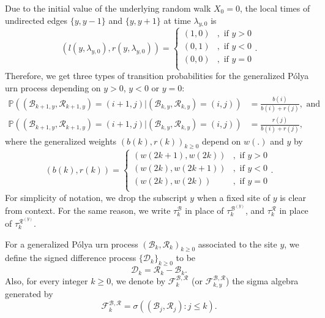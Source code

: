 \documentclass[twoside,12pt,a4paper]{article}
\numberwithin{equation}{section}
\begin{document}
	   Due to the initial value of the underlying random walk $X_0=0$, the local times of undirected edges $\{y,y-1\}$ and $\{y,y+1\}$ at time $\lambda_{y,0}$ is 
	\begin{equation}\label{eq: initial condition}
		\left(l(y,\lambda_{y,0}),  r( y ,\lambda_{y,0})\right) =  \begin{cases}	
			(1, 0) &,  \text{ if }  y>0 \\
			(0, 1) &,  \text{ if }  y<0 \\  
			(0, 0) &,  \text{ if }  y=0 \\
		\end{cases} 
	.\end{equation}	
	Therefore, we get three types of transition probabilities
	for the generalized P\'{o}lya urn process depending on $y>0$, $y<0$ or $y=0$:
	\begin{align*}\label{eq: transition prob for GPU}
		\mathbb{P} \left(\left(\mathcal{B}_{k+1,y},\mathcal{R}_{k+1,y} \right)=  (i+1,j) \vert (\mathcal{B}_{k,y},\mathcal{R}_{k,y}) =(i,j)  \right) &= \frac{b(i)}{b(i)+r(j)}, \mbox{ and}  \\
		\mathbb{P} \left((\mathcal{B}_{k+1,y},\mathcal{R}_{k+1,y})=  (i+1,j) \vert (\mathcal{B}_{k,y},\mathcal{R}_{k,y}) =(i,j)  \right) &= \frac{r(j)}{b(i)+r(j)},
	\end{align*} 
	where the generalized weights $(b(k),r(k))_{k\geq 0}$ depend on $w(.)$ and $y$ by  
	\begin{equation}\label{eq: generalized weights}
		(b(k), r(k)) = \begin{cases}
			(w(2k+1), w(2k)) &,  \text{ if }  y>0 \\
			(w(2k), w(2k+1)) &,  \text{ if }  y<0 \\  
			(w(2k), w(2k)) &,  \text{ if }  y=0 \\ 
		\end{cases}.
	\end{equation}
	For simplicity of notation, we drop the subscript $y$ when a fixed site of $y$ is clear from context. For the same reason, we write $\tau_k^{\mathcal{B}}$ in place of $\tau_k^{\mathcal{B}^{(y)}}$, and $\tau_k^{\mathcal{R}}$ in place of $\tau_k^{\mathcal{R}^{(y)}}$.

	For a generalized P\'{o}lya urn process $(\mathcal{B}_k,\mathcal{R}_k )_{k\geq 0}$ associated to the site $y$, we define the signed difference process $\{\mathcal{D}_{k}\}_{k \ge 0} $ to be
	\begin{equation}\label{eq:signed difference}
		\mathcal{D}_k  =\mathcal{R}_k -\mathcal{B}_k.  
	\end{equation}
	Also, for every integer $k\geq 0$, we denote by $\mathcal{F}^{\mathcal{B},\mathcal{R}}_k$ (or $\mathcal{F}^{\mathcal{B},\mathcal{R}}_{k,y}$) the sigma algebra generated by  
	\[\mathcal{F}^{\mathcal{B},\mathcal{R}}_k = \sigma\left((\mathcal{B}_j,\mathcal{R}_j ): j\leq k \right).
	\]  
	
\end{document}

